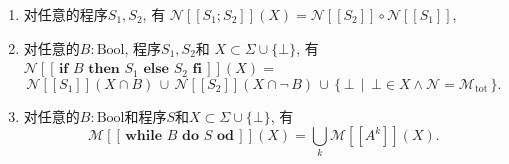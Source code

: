 \documentclass[UTF8]{ctexart}
\begin{document}
\begin{enumerate}
    \item 对任意的程序$S_1,S_2$, 有
    $\mathcal{N}[\![S_1;S_2]\!](X)=\mathcal{N}[\![S_2]\!]\circ
    \mathcal{N}[\![S_1]\!]$,
    \item 对任意的$B:\mathrm{Bool}$, 程序$S_1,S_2$和
    $X\subset\Sigma\cup\{\bot\}$, 有
    $\mathcal{N}[\![\,\mathbf{if}\,\,B\,\,\mathbf{then}\,\,S_1\,\,
    \mathbf{else}\,\,S_2\,\,\mathbf{fi}\,]\!](X)=$
    \[
        \mathcal{N}[\![S_1]\!](X\cap B)\,\cup\,
        \mathcal{N}[\![S_2]\!](X\cap\neg\,B)\,\cup\,
        \{\,\bot\,\mid\,\bot\in X\land\mathcal{N}=\mathcal{M}_{\mathrm{tot}}\,\}.
    \]
    \item 对任意的$B:\mathrm{Bool}$和程序$S$和$X\subset\Sigma\cup\{\bot\}$, 有
    \[
        \mathcal{M}[\![\,\mathbf{while}\,\,B\,\,\mathbf{do}
        \,\,S\,\,\mathbf{od}\,]\!](X)=\bigcup_k\mathcal{M}[\![A^k]\!](X).
    \]
\end{enumerate}
\end{document}
